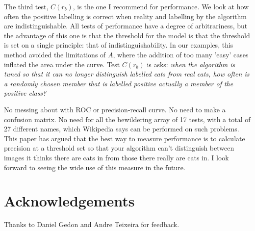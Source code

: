 \documentclass[preprint,12pt]{elsarticle}
\begin{document}
The third test, $C(r_b)$, is the one I recommend for performance. We look at how often the positive labelling is correct when reality and labelling by the algorithm are indistinguishable. All tests of performance have a degree of arbitrariness, but the advantage of this one is that the threshold for the model is that the threshold is set on a single principle: that of indistinguishability. In our examples, this method avoided the limitations of $A$, where the addition of too many 'easy' cases inflated the area under the curve. Test $C(r_b)$ is asks: {\it when the algorithm is tuned so that it can no longer distinguish labelled cats from real cats, how often is a randomly chosen member that is labelled positive actually a member of the positive class?} 

No messing about with ROC or precision-recall curve. No need to make a confusion matrix. No need for all the bewildering array of 17 tests, with a total of 27 different names, which Wikipedia says can be performed on such problems. This paper has argued that the best way to measure performance is to calculate precision at a threshold set so that your algorithm can't distinguish between images it thinks there are cats in from those there really are cats in.  I look forward to seeing the wide use of this measure in the future. 

\section{Acknowledgements}

Thanks to Daniel Gedon and Andre Teixeira for feedback. 




\end{document}
